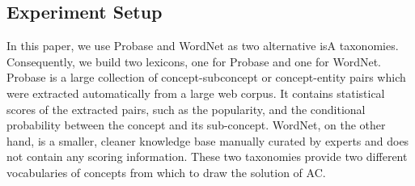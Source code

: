 \subsection{Experiment Setup}
\label{sec:preprocess}
In this paper, we use Probase\cite{WuLWZ12} and WordNet\cite{wordnet}
as two alternative isA taxonomies.
Consequently, we build two lexicons, one
for Probase and one for WordNet. Probase is a large collection of
concept-subconcept or concept-entity pairs which were
extracted automatically
from a large web corpus.
It contains statistical scores of the extracted pairs,
such as the popularity,
and the conditional probability between the concept and its sub-concept.
WordNet, on the other hand, is a smaller, cleaner knowledge base manually
curated by experts and does not contain any scoring information.
These two taxonomies provide two different vocabularies of concepts
from which to draw the solution of AC.

